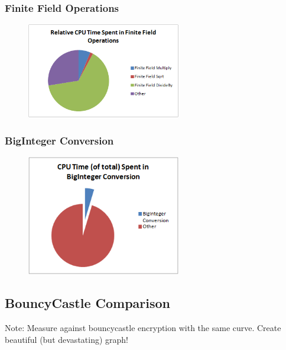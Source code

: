 \subsubsection{Finite Field Operations}
\label{sec:performance_components_finitefield}

\begin{figure}[htb]
	\centering
	\includegraphics[width=0.6\textwidth]{performance/finite-field--relative-time}
\end{figure}

\subsubsection{BigInteger Conversion}
\label{sec:performance_components_biginteger}

\begin{figure}[htb]
	\centering
	\includegraphics[width=0.6\textwidth]{performance/biginteger-conversion--relative-time}
\end{figure}

\subsection{BouncyCastle Comparison}
\label{sec:performance_bouncycastle}
Note: Measure against bouncycastle encryption with the same curve. Create beautiful (but devastating) graph!